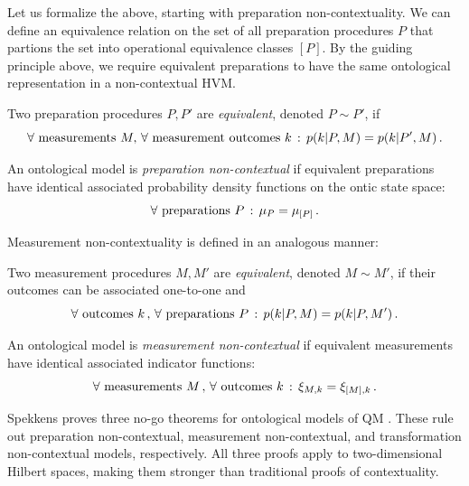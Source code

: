 Let us formalize the above, starting with preparation non-contextuality. We can define an equivalence relation on the set of all preparation procedures $P$ that partions the set into operational equivalence classes $[P]$. By the guiding principle above, we require equivalent preparations to have the same ontological representation in a non-contextual HVM.

\begin{definition}\hfill\break
\label{def:prepnc}
Two preparation procedures $P,P'$ are \emph{equivalent}, denoted $P\sim P'$, if 
\begin{equation*}
    \forall \text{ measurements } M,\thinspace \forall \text{ measurement outcomes } k\thinspace:\thinspace p(k\vert P,M)=p(k\vert P',M)\thinspace.
\end{equation*}

An ontological model is \emph{preparation non-contextual} if equivalent preparations have identical associated probability density functions on the ontic state space: 
\begin{equation*}
    \forall \text{ preparations } P\thinspace:\thinspace \mu_{P}=\mu_{[P]}\thinspace.
\end{equation*}
\end{definition}

Measurement non-contextuality is defined in an analogous manner:

\begin{definition}\hfill\break
\label{def:mntnc}
Two measurement procedures $M,M'$ are \emph{equivalent}, denoted $M\sim M'$, if their outcomes can be associated one-to-one and 
\begin{equation*}
    \forall \text{ outcomes } k\thinspace,\thinspace \forall \text{ preparations } P\thinspace:\thinspace p(k\vert P,M)=p(k\vert P,M')\thinspace.
\end{equation*}

An ontological model is \emph{measurement non-contextual} if equivalent measurements have identical associated indicator functions: 
\begin{equation*}
    \forall \text{ measurements } M\thinspace,\thinspace \forall \text{ outcomes } k\thinspace:\thinspace \xi_{M,k}=\xi_{[M],k}\thinspace.
\end{equation*}
\end{definition}

Spekkens proves three no-go theorems for ontological models of QM \cite{Spekkens2005}. These rule out preparation non-contextual, measurement non-contextual, and transformation non-contextual models, respectively. All three proofs apply to two-dimensional Hilbert spaces, making them stronger than traditional proofs of contextuality.

